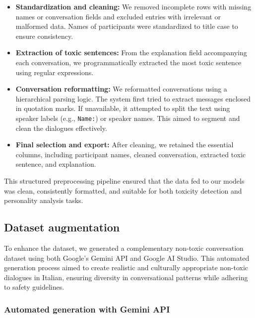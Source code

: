 \documentclass[conference]{IEEEtran}
\begin{document}
\begin{itemize}
    \item \textbf{Standardization and cleaning:} We removed incomplete rows with missing names or conversation fields and excluded entries with irrelevant or malformed data. Names of participants were standardized to title case to ensure consistency.
    
    \item \textbf{Extraction of toxic sentences:} From the explanation field accompanying each conversation, we programmatically extracted the most toxic sentence using regular expressions.
    
    \item \textbf{Conversation reformatting:} We reformatted conversations using a hierarchical parsing logic. The system first tried to extract messages enclosed in quotation marks. If unavailable, it attempted to split the text using speaker labels (e.g., \texttt{Name:}) or speaker names. This aimed to segment and clean the dialogues effectively.
    
    \item \textbf{Final selection and export:} After cleaning, we retained the essential columns, including participant names, cleaned conversation, extracted toxic sentence, and explanation.
\end{itemize}

This structured preprocessing pipeline ensured that the data fed to our models was clean, consistently formatted, and suitable for both toxicity detection and personality analysis tasks.

\subsection{Dataset augmentation}

To enhance the dataset, we generated a complementary non-toxic conversation dataset using both Google's Gemini API and Google AI Studio. This automated generation process aimed to create realistic and culturally appropriate non-toxic dialogues in Italian, ensuring diversity in conversational patterns while adhering to safety guidelines.

\subsubsection{Automated generation with Gemini API}
\end{document}
